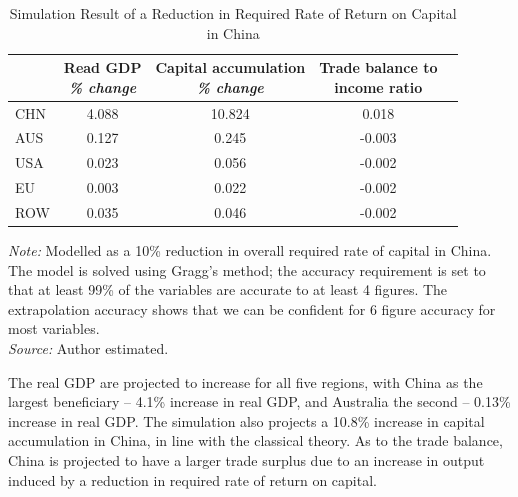 \documentclass[AER]{AEA}
\begin{document}
\begin{table}[!htb]
\begin{threeparttable}
\caption{Simulation Result of a Reduction in Required Rate of 
Return on Capital in China}
\label{tab:sim-rorc}
\def\theadset{\def\arraytretch{1.5}}
\def\arraystretch{1.2}
\small
\begin{tabular}{lcccc}
\hline\hline
    & \thead{Read GDP\\\emph{\% change}} 
    & \thead{Capital accumulation\\\emph{\% change}} 
    & \thead{Trade balance to\\income ratio} \\
\hline
CHN & 4.088 &	10.824 & 0.018 \\
AUS & 0.127 &	0.245 & -0.003 \\
USA & 0.023 &	0.056 & -0.002 \\
EU  & 0.003 &	0.022 & -0.002 \\
ROW & 0.035 &	0.046 & -0.002 \\
\hline\hline
\end{tabular}
\begin{tablenotes}
\footnotesize
\emph{Note:} Modelled as a 10\% reduction in overall required rate of 
capital in China. 
The model is solved using Gragg's method; the accuracy requirement is set to that 
at least 99\% of the variables are accurate to at least 4 figures. 
The extrapolation accuracy shows that we can be confident for 6 figure accuracy 
for most variables.\\
\emph{Source:} Author estimated.
\end{tablenotes}
\end{threeparttable}
\end{table}

The real GDP are projected to increase for all five regions, with China 
as the largest beneficiary -- 4.1\% increase in real GDP, and 
Australia the second -- 0.13\% increase in real GDP.
The simulation also projects a 10.8\% increase in capital 
accumulation in China, in line with the classical theory. 
As to the trade balance, China is projected to have a larger trade surplus 
due to an increase in output induced by a reduction in required rate 
of return on capital. 
\end{document}
